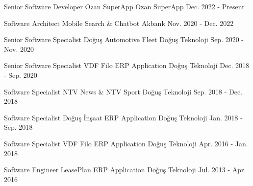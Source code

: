

\begin{cventries}

  \cventry
    {Senior Software Developer} %
    {Ozan SuperApp} %
    {Ozan SuperApp} %
    {Dec. 2022 - Present} %
    {}

  \cventry
    {Software Architect} %
    {Mobile Search \& Chatbot} %
    {Akbank} %
    {Nov. 2020 - Dec. 2022} %
    {}

  \cventry
    {Senior Software Specialist} %
    {Doğuş Automotive Fleet} %
    {Doğuş Teknoloji} %
    {Sep. 2020 - Nov. 2020} %
    {}

  \cventry
    {Senior Software Specialist} %
    {VDF Filo ERP Application} %
    {Doğuş Teknoloji} %
    {Dec. 2018 - Sep. 2020} %
    {}

  \cventry
    {Software Specialist} %
    {NTV News \& NTV Sport} %
    {Doğuş Teknoloji} %
    {Sep. 2018 - Dec. 2018} %
    {}

  \cventry
    {Software Specialist} %
    {Doğuş İnşaat ERP Application} %
    {Doğuş Teknoloji} %
    {Jan. 2018 - Sep. 2018} %
    {}

  \cventry
    {Software Specialist} %
    {VDF Filo ERP Application} %
    {Doğuş Teknoloji} %
    {Apr. 2016 - Jan. 2018} %
    {}

  \cventry
    {Software Engineer} %
    {LeasePlan ERP Application} %
    {Doğuş Teknoloji} %
    {Jul. 2013 - Apr. 2016} %
    {}

\end{cventries}
